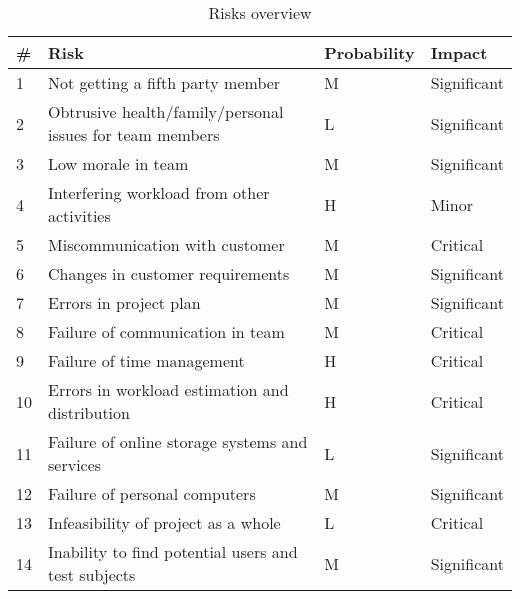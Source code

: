 \begin{table}
\begin{tabularx}{\textwidth}{ | l | X | l | l | }
  \hline
  \textbf{\#} & \textbf{Risk} & \textbf{Probability} & \textbf{Impact} \\ \hline
  1 & Not getting a fifth party member & M & Significant \\ \hline
  2 & Obtrusive health/family/personal issues for team members & L & Significant \\ \hline
  3 & Low morale in team & M & Significant \\ \hline
  4 & Interfering workload from other activities & H & Minor \\ \hline
  5 & Miscommunication with customer & M & Critical \\ \hline
  6 & Changes in customer requirements & M & Significant \\ \hline
  7 & Errors in project plan & M & Significant \\ \hline
  8 & Failure of communication in team & M & Critical \\ \hline
  9 & Failure of time management & H & Critical \\ \hline
 10 & Errors in workload estimation and distribution & H & Critical \\ \hline
 11 & Failure of online storage systems and services & L & Significant \\ \hline
 12 & Failure of personal computers & M & Significant \\ \hline
 13 & Infeasibility of project as a whole & L & Critical \\ \hline
 14 & Inability to find potential users and test subjects & M & Significant \\ \hline
\end{tabularx}
\caption{Risks overview}
\end{table}


